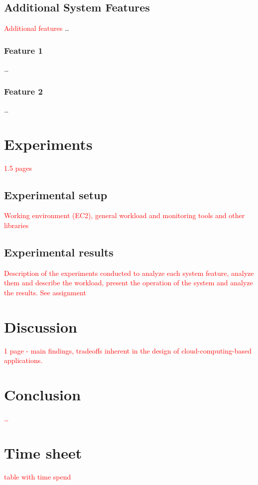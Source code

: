 \documentclass{stylesheet}
\begin{document}
\subsection{Additional System Features}
\label{subsec:additionalFeatures}
\textcolor{red}{Additional features}
\ldots
\subsubsection{Feature 1}
\ldots
\subsubsection{Feature 2}
\ldots

\section{Experiments}
\label{sec:experiments}
\textcolor{red}{1.5 pages}
\subsection{Experimental setup}
\label{subsec:setup}
\textcolor{red}{Working environment (EC2), general workload and monitoring tools and other libraries}

\subsection{Experimental results}
\label{subsec:results}
\textcolor{red}{Description of the experiments conducted to analyze each system feature, analyze them and describe the workload, present the operation of the system and analyze the results. See assignment}

\section{Discussion}
\label{sec:discussion}
\textcolor{red}{1 page - main findings, tradeoffs inherent in the design of cloud-computing-based applications.}

\section{Conclusion}
\label{sec:conclusion}
\textcolor{red}{\ldots}




\appendix
\section{Time sheet}
\label{app:time}
\textcolor{red}{table with time spend}
\end{document}
